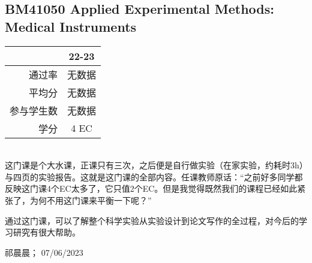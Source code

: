 \subsection[BM41050 Applied Experimental Methods: Medical Instruments]{BM41050 Applied Experimental Methods: Medical Instruments}
\begin{minipage}{0.45\textwidth}
\centering
{}
\end{minipage}%
\begin{minipage}{0.45\textwidth}
\raggedleft
\begin{tabular}{r|c}
\textbf{ } & \textbf{22-23} \\ \hline
通过率 & 无数据 \\ 
平均分 & 无数据 \\ 
参与学生数 & 无数据 \\
学分 & 4 EC\\
\end{tabular}
\end{minipage}\\

这门课是个大水课，正课只有三次，之后便是自行做实验（在家实验，约耗时3h）与四页的实验报告。这就是这门课的全部内容。任课教师原话：“之前好多同学都反映这门课4个EC太多了，它只值2个EC。但是我觉得既然我们的课程已经如此紧张了，为何不用这门课来平衡一下呢？”

通过这门课，可以了解整个科学实验从实验设计到论文写作的全过程，对今后的学习研究有很大帮助。
\begin{flushright}
祁晨晨； 07/06/2023
\end{flushright}

